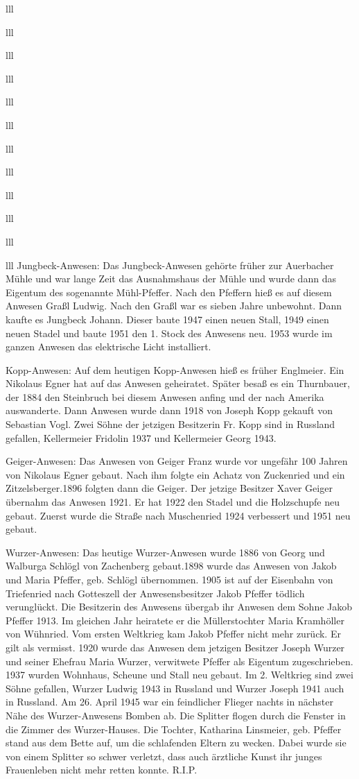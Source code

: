 \documentclass[12pt,a4pager]{book}
\begin{document}
\begin{tabuluar}{lll}
\begin{tabuluar}{lll}
\begin{tabuluar}{lll}
\begin{tabuluar}{lll}
\begin{tabuluar}{lll}
\begin{tabuluar}{lll}
\begin{tabuluar}{lll}
\begin{tabuluar}{lll}
\begin{tabuluar}{lll}
\begin{tabuluar}{lll}
\begin{tabuluar}{lll}
\begin{tabuluar}{lll}
Jungbeck-Anwesen: Das Jungbeck-Anwesen gehörte früher zur Auerbacher Mühle und
war lange Zeit das Ausnahmshaus der Mühle und wurde dann das Eigentum des
sogenannte Mühl-Pfeffer. Nach den Pfeffern hieß es auf diesem Anwesen Graßl
Ludwig. Nach den Graßl war es sieben Jahre unbewohnt. Dann kaufte es Jungbeck
Johann. Dieser baute 1947 einen neuen Stall, 1949 einen neuen Stadel und baute
1951 den 1. Stock des Anwesens neu. 1953 wurde im ganzen Anwesen das elektrische
Licht installiert.

Kopp-Anwesen: Auf dem heutigen Kopp-Anwesen hieß es früher Englmeier. Ein
Nikolaus Egner hat auf das Anwesen geheiratet. Später besaß es ein Thurnbauer,
der 1884 den Steinbruch bei diesem Anwesen anfing und der nach Amerika
auswanderte. Dann Anwesen wurde dann 1918 von Joseph Kopp gekauft von Sebastian
Vogl. Zwei Söhne der jetzigen Besitzerin Fr. Kopp sind in Russland gefallen,
Kellermeier Fridolin 1937 und Kellermeier Georg 1943.

Geiger-Anwesen: Das Anwesen von Geiger Franz wurde vor ungefähr 100 Jahren von
Nikolaus Egner gebaut. Nach ihm folgte ein Achatz von Zuckenried und ein
Zitzelsberger.1896 folgten dann die Geiger. Der jetzige Besitzer Xaver Geiger
übernahm das Anwesen 1921. Er hat 1922 den Stadel und die Holzschupfe neu
gebaut. Zuerst wurde die Straße nach Muschenried 1924 verbessert und 1951 neu
gebaut.

Wurzer-Anwesen: Das heutige Wurzer-Anwesen wurde 1886 von Georg und Walburga
Schlögl von Zachenberg gebaut.1898 wurde das Anwesen von Jakob und Maria
Pfeffer, geb. Schlögl übernommen. 1905 ist auf der Eisenbahn von Triefenried
nach Gotteszell der Anwesensbesitzer Jakob Pfeffer tödlich verunglückt. Die
Besitzerin des Anwesens übergab ihr Anwesen dem Sohne Jakob Pfeffer 1913. Im
gleichen Jahr heiratete er die Müllerstochter Maria Kramhöller von Wühnried. Vom
ersten Weltkrieg kam Jakob Pfeffer nicht mehr zurück. Er gilt als vermisst. 1920
wurde das Anwesen dem jetzigen Besitzer Joseph Wurzer und seiner Ehefrau Maria
Wurzer, verwitwete Pfeffer als Eigentum zugeschrieben. 1937 wurden Wohnhaus,
Scheune und Stall neu gebaut. Im 2. Weltkrieg sind zwei Söhne gefallen, Wurzer
Ludwig 1943 in Russland und Wurzer Joseph 1941 auch in Russland. Am 26. April
1945 war ein feindlicher Flieger nachts in nächster Nähe des Wurzer-Anwesens
Bomben ab. Die Splitter flogen durch die Fenster in die Zimmer des
Wurzer-Hauses. Die Tochter, Katharina Linsmeier, geb. Pfeffer stand aus dem
Bette auf‚ um die schlafenden Eltern zu wecken. Dabei wurde sie von einem
Splitter so schwer verletzt, dass auch ärztliche Kunst ihr junges Frauenleben
nicht mehr retten konnte. R.I.P.


\end{tabuluar}
\end{tabuluar}
\end{tabuluar}
\end{tabuluar}
\end{tabuluar}
\end{tabuluar}
\end{tabuluar}
\end{tabuluar}
\end{tabuluar}
\end{tabuluar}
\end{tabuluar}
\end{tabuluar}
\end{document}
